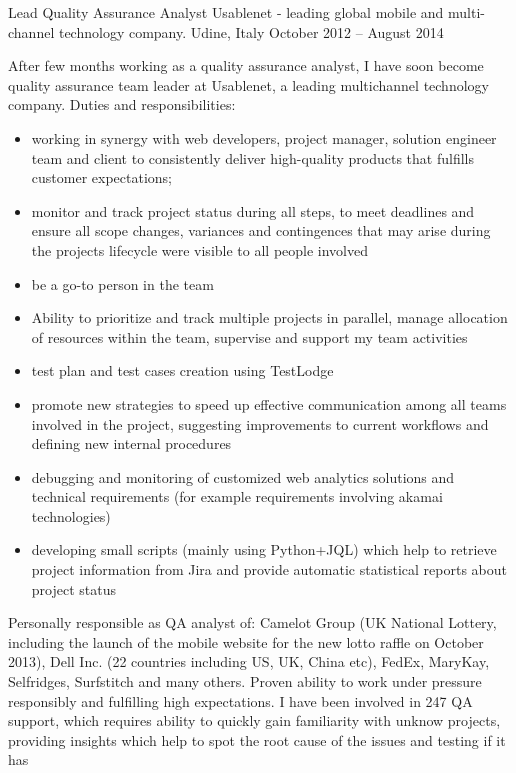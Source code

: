 \begin{cventries}
\cventry
{Lead Quality Assurance Analyst} 
{Usablenet - leading global mobile and multi-channel technology company.}
   {Udine, Italy}
{October 2012 -- August 2014}
   {
      After few months working as a quality assurance analyst, I
      have soon become
   quality assurance team leader at Usablenet, a leading multichannel technology
   company. 
   Duties and responsibilities:
   \begin{itemize}
\item 
  working in synergy with  web
   developers, project manager, solution engineer team and client to
   consistently deliver high-quality
   products that fulfills customer expectations;
\item monitor and track project status during all steps, to meet deadlines
   and ensure all scope changes,
 variances and contingences that may arise during the 
 projects lifecycle were visible to all people involved
 \item  be a go-to person in the team
 \item 
   Ability to prioritize and track multiple projects in parallel,
    manage  allocation of resources within the team, supervise and support my team
    activities
\item test plan and test cases creation using TestLodge
\item promote new strategies to speed up effective communication among all
   teams involved in the project, suggesting 
   improvements to current workflows and defining new internal procedures
\item debugging and monitoring of customized web analytics solutions and 
technical requirements (for example requirements involving
   akamai technologies)
   \item developing small scripts (mainly using Python+JQL) which help to retrieve project
 information from Jira and provide automatic statistical reports about project status
 \end{itemize} 
   Personally responsible as QA analyst of:
   Camelot Group (UK National Lottery, including the
   launch of the mobile website for the new lotto raffle on October 2013), Dell Inc. (22 countries
   including US, UK, China etc), FedEx,
   MaryKay, Selfridges, Surfstitch and many others.
   Proven ability to work under pressure responsibly and fulfilling high
   expectations.
I have been involved in 247 QA support, which requires ability to quickly gain
familiarity with unknow projects, providing insights which help to spot the root
cause of the issues and testing if it has
}
\end{cventries}
